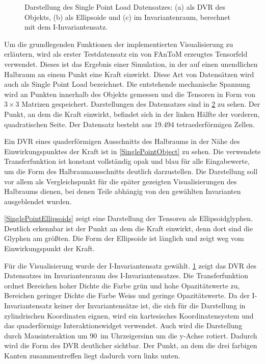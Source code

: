 \documentclass[a4paper,fontsize=12pt,toc=bib,parskip=half,ngerman]{scrartcl}
\begin{document}
\begin{figure}
\begin{subfigure}{0.34\textwidth}
		\subcaption{}
		\label{SinglePointInvariantSpace}
	\end{subfigure}
	\caption{Darstellung des Single Point Load Datensatzes: (a) als DVR des Objekts, (b) als Ellipsoide und (c) im Invariantenraum, berechnet mit dem I-Invariantensatz.}
	\label{SinglePoint}
\end{figure}
Um die grundlegenden Funktionen der implementierten Visualisierung zu erl\"autern, wird als erster Testdatensatz ein von FAnToM erzeugtes Tensorfeld verwendet. Dieses ist das Ergebnis einer Simulation, in der auf einen unendlichen Halbraum an einem Punkt eine Kraft einwirkt. Diese Art von Datens\"atzen wird auch als \glq Single Point Load\grq{} bezeichnet. Die entstehende mechanische Spannung wird an Punkten innerhalb des Objekts gemessen und die Tensoren in Form von $3\times3$ Matrizen gespeichert. Darstellungen des Datensatzes sind in \cref{SinglePoint} zu sehen. Der Punkt, an dem die Kraft einwirkt, befindet sich in der linken H\"alfte der vorderen, quadratischen Seite. Der Datensatz besteht aus 19.494 tetraederf\"ormigen Zellen.

Ein DVR eines quaderf\"ormigen Ausschnitts des Halbraums in der N\"ahe des Einwirkungspunktes der Kraft ist in \cref{SinglePointObject} zu sehen. Die verwendete Transferfunktion ist konstant vollst\"andig opak und blau f\"ur alle Eingabewerte, um die Form des Halbraumausschnitts deutlich darzustellen. Die Darstellung soll vor allem als Vergleichspunkt f\"ur die sp\"ater gezeigten Visualisierungen des Halbraums dienen, bei denen Teile abh\"angig von den gew\"ahlten Invarianten ausgeblendet wurden.

\cref{SinglePointEllipsoids} zeigt eine Darstellung der Tensoren als Ellipsoidglyphen. Deutlich erkennbar ist der Punkt an dem die Kraft einwirkt, denn dort sind die Glyphen am gr\"o{\ss}ten. Die Form der Ellipsoide ist l\"anglich und zeigt weg vom Einwirkungspunkt der Kraft.

F\"ur die Visualisierung wurde der I-Invariantensatz gew\"ahlt. \cref{SinglePointInvariantSpace} zeigt das DVR des Datensatzes im Invariantenraum des I-Invariantensatzes. Die Transferfunktion ordnet Bereichen hoher Dichte die Farbe gr\"un und hohe Opazit\"atswerte zu, Bereichen geringer Dichte die Farbe Weiss und geringe Opazit\"atswerte. Da der I-Invariantensatz keiner der Invariantens\"atze ist, die sich f\"ur die Darstellung in zylindrischen Koordinaten eignen, wird ein kartesisches Koordinatensystem und das quaderf\"ormige Interaktionswidget verwendet. Auch wird die Darstellung durch Mausinteraktion um 90\textdegree~im Uhrzeigersinn um die y-Achse rotiert. Dadurch wird die Form des DVR deutlicher sichtbar. Der Punkt, an dem die drei farbigen Kanten zusammentreffen liegt dadurch vorn links unten. 
\end{document}
